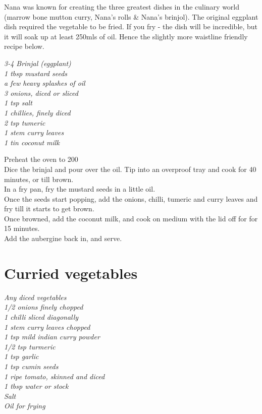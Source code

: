 \documentclass{tufte-book}
\begin{document}
Nana was known for creating the three greatest dishes in the culinary world (marrow bone mutton curry, Nana's rolls \& Nana's brinjol). The original eggplant dish required the vegetable to be fried. If you fry - the dish will be incredible, but it will soak up at least 250mls of oil. Hence the slightly more waistline friendly recipe below.

\smallskip
\emph{3-4 Brinjal (eggplant)
\\1 tbsp mustard seeds
\\a few heavy splashes of oil
\\3 onions, diced or sliced
\\1 tsp salt
\\1 chillies, finely diced
\\2 tsp tumeric
\\1 stem curry leaves
\\1 tin coconut milk}

\smallskip
Preheat the oven to 200\celsius 
\\Dice the brinjal and pour over the oil. Tip into an overproof tray and cook for 40 minutes, or till brown.
\\In a fry pan, fry the mustard seeds in a little oil.
\\Once the seeds start popping, add the onions, chilli, tumeric and curry leaves and fry till it starts to get brown.
\\Once browned, add the coconut milk, and cook on medium with the lid off for for 15 minutes.  
\\Add the aubergine back in, and serve.


\section{Curried vegetables}

\emph{Any diced vegetables
\\1/2 onions finely chopped
\\1 chilli sliced diagonally
\\1 stem curry leaves chopped
\\1 tsp mild indian curry powder
\\1/2 tsp turmeric
\\1 tsp garlic
\\1 tsp cumin seeds
\\1 ripe tomato, skinned and diced
\\1 tbsp water or stock
\\Salt
\\Oil for frying}
\end{document}
